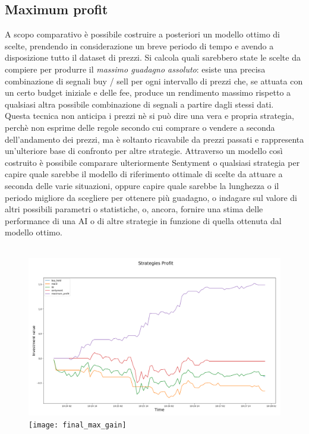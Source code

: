\documentclass[a4paper,12pt]{report}
\begin{document}
\begin{fig}
\subsection{Maximum profit}
A scopo comparativo è possibile costruire a posteriori un modello ottimo di scelte, prendendo in considerazione un breve periodo di tempo e avendo a disposizione tutto il dataset di prezzi. Si calcola quali sarebbero state le scelte da compiere per produrre il \textit{massimo guadagno assoluto}: esiste una precisa combinazione di segnali buy / sell per ogni intervallo di prezzi che, se attuata con un certo budget iniziale e delle fee, produce un rendimento massimo rispetto a qualsiasi altra possibile combinazione di segnali a partire dagli stessi dati.\\ Questa tecnica non anticipa i prezzi nè si può dire una vera e propria strategia, perchè non esprime delle regole secondo cui comprare o vendere a seconda dell'andamento dei prezzi, ma è soltanto ricavabile da prezzi passati e rappresenta un'ulteriore base di confronto per altre strategie. Attraverso un modello così costruito è possibile comparare ulteriormente Sentyment o qualsiasi strategia per capire quale sarebbe il modello di riferimento ottimale di scelte da attuare a seconda delle varie situazioni, oppure capire quale sarebbe la lunghezza o il periodo migliore da scegliere per ottenere più guadagno, o indagare sul valore di altri possibili parametri o statistiche, o, ancora, fornire una stima delle performance di una AI o di altre strategie in funzione di quella ottenuta dal modello ottimo.\\~\\
\begin{fig}
	\begin{subfigure}{\linewidth}
		\includegraphics[width=.5\linewidth]{final_gain_max}
		\texttt{[image: final\_max\_gain]}
	\end{subfigure}
	\label{Figura 28}
\end{fig}

\end{fig}
\end{document}
